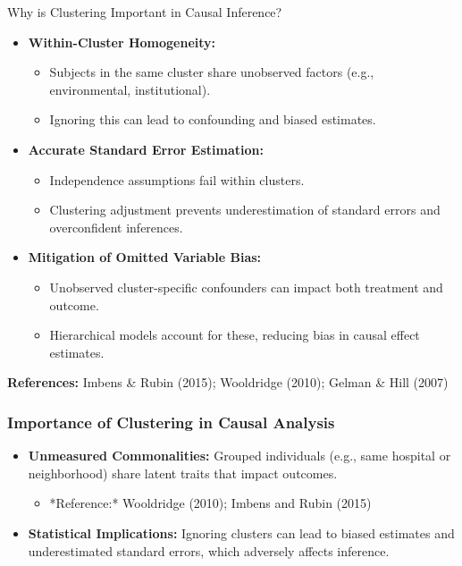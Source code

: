 \documentclass{beamer}
\begin{document}
\begin{frame}{Why is Clustering Important in Causal Inference?}
    \begin{itemize}
      \item \textbf{Within-Cluster Homogeneity:} 
        \begin{itemize}
          \item Subjects in the same cluster share unobserved factors (e.g., environmental, institutional).
          \item Ignoring this can lead to confounding and biased estimates.
        \end{itemize}
      \item \textbf{Accurate Standard Error Estimation:}
        \begin{itemize}
          \item Independence assumptions fail within clusters.
          \item Clustering adjustment prevents underestimation of standard errors and overconfident inferences.
        \end{itemize}
      \item \textbf{Mitigation of Omitted Variable Bias:}
        \begin{itemize}
          \item Unobserved cluster-specific confounders can impact both treatment and outcome.
          \item Hierarchical models account for these, reducing bias in causal effect estimates.
        \end{itemize}
    \end{itemize}
    \vspace{0.3cm}
    \footnotesize \textbf{References:} Imbens \& Rubin (2015); Wooldridge (2010); Gelman \& Hill (2007)
  \end{frame}
\begin{frame}
    \frametitle{Importance of Clustering in Causal Analysis}
    \begin{itemize}
        \item \textbf{Unmeasured Commonalities:}  
              Grouped individuals (e.g., same hospital or neighborhood) share latent traits that impact outcomes.
              \begin{itemize}
                  \item *Reference:* Wooldridge (2010); Imbens and Rubin (2015)
              \end{itemize}
        \item \textbf{Statistical Implications:}  
              Ignoring clusters can lead to biased estimates and underestimated standard errors, which adversely affects inference.
    \end{itemize}
    \end{frame}
    
\end{document}
